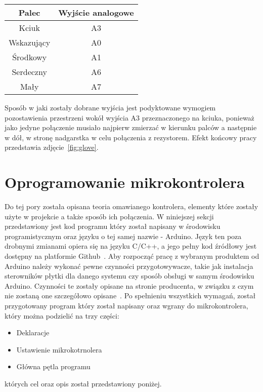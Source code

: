 \begin{center}
\begin{tabular}{|c|c|}
\hline
Palec & Wyjście analogowe \\ \hline
Kciuk & A3 \\ \hline
Wskazujący & A0 \\ \hline
Środkowy & A1 \\ \hline
Serdeczny & A6 \\ \hline
Mały & A7 \\ \hline
\hline
\end{tabular}
\end{center}

Sposób w jaki zostały dobrane wyjścia jest podyktowane wymogiem pozostawienia przestrzeni wokół wyjścia A3 przeznaczonego na kciuka, ponieważ jako jedyne połączenie musiało najpierw zmierzać w kierunku palców a następnie w dół, w stronę nadgarstka w celu połączenia z rezystorem. Efekt końcowy pracy przedstawia zdjęcie~\ref{fig:glove}.

\section{Oprogramowanie mikrokontrolera}
\label{sec:oprogramowanie}


Do tej pory została opisana teoria omawianego kontrolera, elementy które zostały użyte w projekcie a także sposób ich połączenia. W niniejszej sekcji przedstawiony jest kod programu który został napisany w środowisku programistycznym oraz języku o tej samej nazwie - Arduino. Język ten poza drobnymi zmianami opiera się na języku C/C++, a jego pełny kod źródłowy jest dostępny na platformie Github~\cite{jArduino}. Aby rozpocząć pracę z wybranym produktem od Arduino należy wykonać pewne czynności przygotowywacze, takie jak instalacja sterowników płytki dla danego systemu czy sposób obsługi w samym środowisku Arduino. Czynności te zostały opisane na stronie producenta, w związku z czym nie zostaną one szczegółowo opisane~\cite{guideArduino}. Po spełnieniu wszystkich wymagań, został przygotowany program który został napisany oraz wgrany do mikrokontrolera, który można podzielić na trzy części:
\begin{itemize}
\item Deklaracje
\item Ustawienie mikrokotrnolera
\item Główna pętla programu
\end{itemize}
których cel oraz opis został przedstawiony poniżej.

